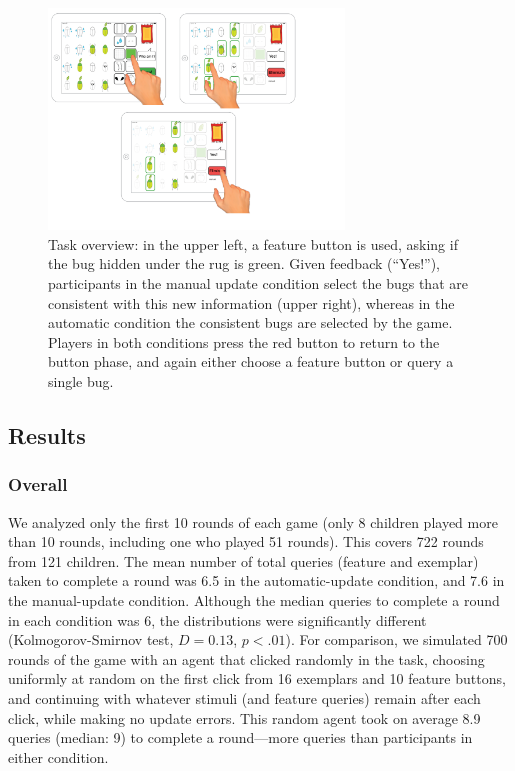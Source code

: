 \documentclass[man,floatsintext]{apa6}
\begin{document}
\begin{figure}[!h]
  \centering
  \includegraphics[width=0.7\textwidth]{figures/task_overview}
  \caption{Task overview: in the upper left, a feature button is used, asking if the bug 
hidden under the rug is green. Given feedback (``Yes!''), participants in the manual 
update condition select the bugs that are consistent with this new information (upper 
right), whereas in the automatic condition the consistent bugs are selected by the 
game. Players in both conditions press the red button to return to the button phase, 
and again either choose a feature button or query a single bug.}
  \label{fig:task-overview}
\end{figure} 

\subsection{Results}
\subsubsection{Overall}

We analyzed only the first 10 rounds of each game (only 8 children played more than 
10 rounds, including one who played 51 rounds). This covers 722 rounds from 121 
children. The mean number of total queries (feature and exemplar) taken to complete a round was 6.5 in the automatic-update condition, and 7.6 in the manual-update condition. Although the median queries to complete a round in each condition was 6, the distributions were significantly different (Kolmogorov-Smirnov test, $D = 
0.13$, $p<.01$). For comparison, we simulated 700 rounds of the game with an agent that clicked
randomly in the task, choosing uniformly at random on the first click from 16 exemplars and 10 feature buttons, and continuing with whatever stimuli (and feature queries) remain after each click, while making no update errors. This random agent took on average 8.9 queries (median: 9) to complete a round---more queries than participants in either condition.
\end{document}
